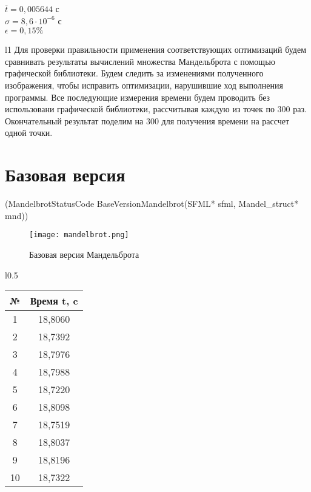 \documentclass[12pt, letterpaper]{article}
\begin{document}
    $\bar{t} = 0,005644$ с\\
    
    $\sigma = 8,6 \cdot 10^{-6}$ с\\
    
    $\epsilon = 0,15\%$

    \begin{wraptable}{l}{1\textwidth}
    Для проверки правильности применения соответствующих оптимизаций будем сравнивать результаты вычислений множества Мандельброта с помощью графической библиотеки. Будем следить за изменениями полученного изображения, чтобы исправить оптимизации, нарушившие ход выполнения программы. Все последующие измерения времени будем проводить без использовани графической библиотеки, рассчитывая каждую из точек по 300 раз. Окончательный результат поделим на 300 для получения времени на рассчет одной точки. 

    \section{Базовая версия} (MandelbrotStatusCode BaseVersionMandelbrot(SFML* sfml, Mandel\_struct* mnd))
    
    \end{wraptable}
    
    \begin{figure}[h]
        \centering
        \texttt{[image: mandelbrot.png]}
        \caption{Базовая версия Мандельброта}
        \label{fig:enter-label}
    \end{figure}
    
    \begin{wraptable}{l}{0.5\textwidth}
        \begin{tabular}{cc} 
        \toprule             %
        \textbf{№} & \textbf{Время t, c} \\
        \midrule             %
        1 & 18,8060 \\
        2 & 18,7392 \\
        3 & 18,7976 \\
        4 & 18,7988 \\
        5 & 18,7220 \\
        6 & 18,8098 \\
        7 & 18,7519 \\
        8 & 18,8037 \\
        9 & 18,8196 \\
        10 & 18,7322 \\
        \bottomrule          %
        \end{tabular}
    \end{wraptable}
    
\end{document}
